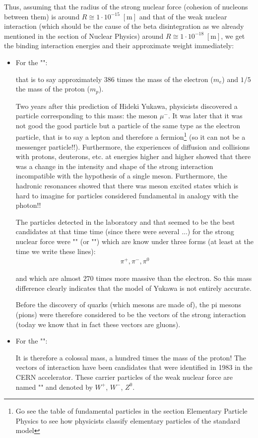 	Thus, assuming that the radius of the strong nuclear force (cohesion of nucleons between them) is around $R\cong 1\cdot 10^{-15}\;[\text{m}]$ and that of the weak nuclear interaction (which should be the cause of the beta disintegration as we already mentioned in the section of Nuclear Physics) around $R\cong 1\cdot 10^{-18}\;[\text{m}]$, we get the binding interaction energies and their approximate weight immediately:
	\begin{itemize}
		\item For the "":
		
		that is to say approximately $386$ times the mass of the electron ($m_e$) and $1/5$ the mass of the proton ($m_p$).
	
		Two years after this prediction of Hideki Yukawa, physicists discovered a particle corresponding to this mass: the meson $\mu^{-}$. It was later that it was not good the good particle but a particle of the same type as the electron particle, that is to say a lepton and therefore a fermion\footnote{Go see the table of fundamental particles in the section Elementary Particle Physics to see how physicists classify elementary particles of the standard model} (so it can not be a messenger particle!!). Furthermore, the experiences of diffusion and collisions with protons, deuterons, etc. at energies higher and higher showed that there was a change in the intensity and shape of the strong interaction incompatible with the hypothesis of a single meson. Furthermore, the hadronic resonances showed that there was meson excited states which is hard to imagine for particles considered fundamental in analogy with the photon!!
	
		The particles detected in the laboratory and that seemed to be the best candidates at that time time (since there were several ...) for the strong nuclear force were "" (or "") which are know under three forms (at least at the time we write these lines):
		\begin{gather*}
			\pi^+,\pi^-,\pi^0
		\end{gather*}
		
		and which are almost $270$ times more massive than the electron. So this mass difference clearly indicates that the model of Yukawa is not entirely accurate.

		Before the discovery of quarks (which mesons are made of), the pi mesons (pions) were therefore considered to be the vectors of the strong interaction (today we know that in fact these vectors are gluons).
	
		\item For the "":
		
		It is therefore a colossal mass, a hundred times the mass of the proton! The vectors of interaction have been candidates that were identified in 1983 in the CERN accelerator. These carrier particles of the weak nuclear force are named "" and denoted by $W^+$, $W^-$, $Z^0$.
	\end{itemize}
